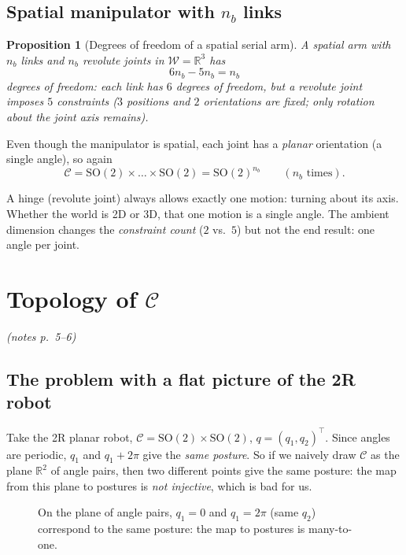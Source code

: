 \documentclass[11pt,a4paper]{article}
\newcommand{\R}{\mathbb{R}}
\newcommand{\W}{\mathcal{W}}
\newcommand{\C}{\mathcal{C}}
\newcommand{\SO}{\mathrm{SO}}
\newcommand{\pts}[1]{\emph{(notes p.~#1)}}
\theoremstyle{definition}
\theoremstyle{plain}
\newtheorem{proposition}[definition]{Proposition}
\theoremstyle{remark}
\begin{document}
\subsection{Spatial manipulator with $n_b$ links}

\begin{proposition}[Degrees of freedom of a spatial serial arm]
A spatial arm with $n_b$ links and $n_b$ revolute joints in $\W=\R^3$ has
\[
  6n_b-5n_b=n_b
\]
degrees of freedom: each link has $6$ degrees of freedom, but a revolute joint imposes $5$ constraints ($3$ positions and $2$ orientations are fixed; only rotation about the joint axis remains).
\end{proposition}

Even though the manipulator is spatial, each joint has a \emph{planar} orientation (a single angle), so again
\[
  \C=\SO(2)\times\dots\times\SO(2)=\SO(2)^{n_b}\qquad(n_b\text{ times}).
\]

\begin{intuition}
A hinge (revolute joint) always allows exactly one motion: turning about its axis. Whether the world is 2D or 3D, that one motion is a single angle. The ambient dimension changes the \emph{constraint count} ($2$ vs.\ $5$) but not the end result: one angle per joint.
\end{intuition}

\section{Topology of $\C$}\label{sec:topology}\pts{5--6}

\subsection{The problem with a flat picture of the 2R robot}

Take the 2R planar robot, $\C=\SO(2)\times\SO(2)$, $q=(q_1,q_2)^\top$. Since angles are periodic, $q_1$ and $q_1+2\pi$ give the \emph{same posture}. So if we naively draw $\C$ as the plane $\R^2$ of angle pairs, then two different points give the same posture: the map from this plane to postures is \emph{not injective}, which is bad for us.

\begin{figure}[ht]
\centering
{}
\caption{On the plane of angle pairs, $q_1=0$ and $q_1=2\pi$ (same $q_2$) correspond to the same posture: the map to postures is many-to-one.}
\end{figure}
\end{document}
